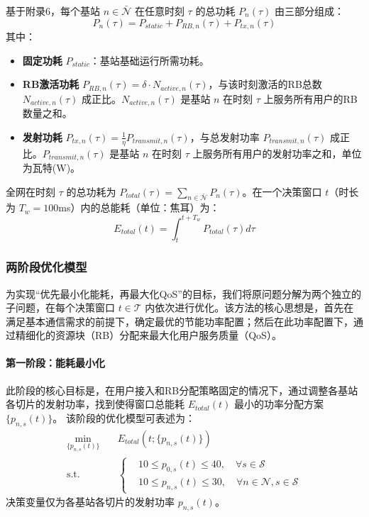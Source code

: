 基于附录6，每个基站 $n \in \bar{\mathcal{N}}$ 在任意时刻 $\tau$ 的总功耗 $P_n(\tau)$ 由三部分组成：
\begin{equation}
P_n(\tau) = P_{static} + P_{RB,n}(\tau) + P_{tx,n}(\tau)
\end{equation}
其中：
\begin{itemize}
  \item \textbf{固定功耗} $P_{static}$：基站基础运行所需功耗。
  \item \textbf{RB激活功耗} $P_{RB,n}(\tau) = \delta \cdot N_{active,n}(\tau)$，与该时刻激活的RB总数 $N_{active,n}(\tau)$ 成正比。$N_{active,n}(\tau)$ 是基站 $n$ 在时刻 $\tau$ 上服务所有用户的RB数量之和。
  \item \textbf{发射功耗} $P_{tx,n}(\tau) = \frac{1}{\eta} P_{transmit,n}(\tau)$，与总发射功率 $P_{transmit,n}(\tau)$ 成正比。$P_{transmit,n}(\tau)$ 是基站 $n$ 在时刻 $\tau$ 上服务所有用户的发射功率之和，单位为瓦特(W)。
\end{itemize}
全网在时刻 $\tau$ 的总功耗为 $P_{total}(\tau) = \sum_{n\in\bar{\mathcal{N}}} P_n(\tau)$。在一个决策窗口 $t$（时长为 $T_w=100$ms）内的总能耗（单位：焦耳）为：
\begin{equation}
E_{total}(t) = \int_{t}^{t+T_w} P_{total}(\tau) d\tau
\end{equation}

\subsubsection{两阶段优化模型}

为实现“优先最小化能耗，再最大化QoS”的目标，我们将原问题分解为两个独立的子问题，在每个决策窗口 $t \in \mathcal{T}$ 内依次进行优化。该方法的核心思想是，首先在满足基本通信需求的前提下，确定最优的节能功率配置；然后在此功率配置下，通过精细化的资源块（RB）分配来最大化用户服务质量（QoS）。

\paragraph{第一阶段：能耗最小化}
此阶段的核心目标是，在用户接入和RB分配策略固定的情况下，通过调整各基站各切片的发射功率，找到使得窗口总能耗 $E_{total}(t)$ 最小的功率分配方案 $\{p_{n,s}(t)\}$。
该阶段的优化模型可表述为：
\begin{equation}
\begin{aligned}
\min_{\{p_{n,s}(t)\}} \quad & E_{total}\left(t; \{p_{n,s}(t)\}\right) \\
\text{s.t.} \quad & 
\left\{
\begin{aligned}
& 10 \le p_{0,s}(t) \le 40, \quad \forall s \in \mathcal{S} \\
& 10 \le p_{n,s}(t) \le 30, \quad \forall n \in \mathcal{N}, s \in \mathcal{S}
\end{aligned}
\right.
\end{aligned}
\end{equation}
决策变量仅为各基站各切片的发射功率 $p_{n,s}(t)$。
